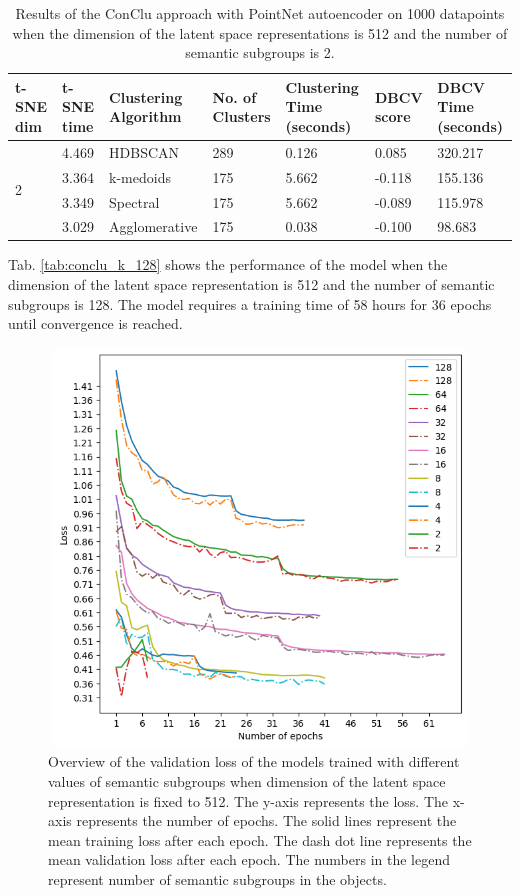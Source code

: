 \begin{table}[H]
  \setlength\extrarowheight{10pt}
  \caption{Results of the ConClu approach with PointNet autoencoder on 1000 datapoints when the dimension of the latent space representations is 512 and the number of semantic subgroups is 2. }
  \centering
  \begin{tabular}{|p{30pt}|p{50pt}|p{60pt}|p{50pt}|p{50pt}|p{50pt}|p{40pt}|}
    \toprule
    \ac{t-SNE} dim	& \ac{t-SNE} time & Clustering Algorithm & No. of Clusters & Clustering Time (seconds) & \ac{DBCV} score & \ac{DBCV} Time (seconds)\\
    \midrule
    \multirow{4}{30pt}{2}	& 4.469 & \ac{HDBSCAN}	& 289	& 0.126 & 0.085	& 320.217 \\ \cline{2-7} 
    & 3.364 & k-medoids	& 175	& 5.662 & -0.118 	& 155.136 \\ \cline{2-7} 
    & 3.349 & Spectral	& 175	& 5.662 & -0.089	& 115.978 \\ \cline{2-7}
    & 3.029 & Agglomerative	& 175	& 0.038 & -0.100	& 98.683 \\ 
    \bottomrule
  \end{tabular}
  \label{tab:conclu_k_2}
\end{table}

Tab. \ref{tab:conclu_k_128} shows the performance of the model when the dimension of the latent space representation is 512 and the number of semantic subgroups is 128. The model requires a training time of 58 hours for 36 epochs until convergence is reached.

\begin{figure}[H]
  \centering
  \includegraphics[width=400pt,height=300pt]{pictures/loss_k.png}
  \caption{Overview of the validation loss of the models trained with different values of semantic subgroups when dimension of the latent space representation is fixed to 512. The y-axis represents the loss. The x-axis represents the number of epochs. The solid lines represent the mean training loss after each epoch. The dash dot line represents the mean validation loss after each epoch. The numbers in the legend represent number of semantic subgroups in the objects.}
  \label{fig:loss_k}
\end{figure} 


